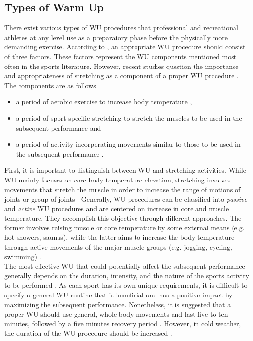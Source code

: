 \subsection{Types of Warm Up}
There exist various types of WU procedures that professional and recreational athletes at any level use as a preparatory phase before the physically more demanding exercise. According to \cite{safran1989warm}, an appropriate WU procedure should consist of three factors. These factors represent the WU components mentioned most often in the sports literature. However, recent studies question the importance and appropriateness of stretching as a component of a proper WU procedure \cite{pereles2012large}. The components are as follows:
\begin{itemize}
\item a period of aerobic exercise to increase body
temperature \cite{safran1989warm},
\item a period of sport-specific stretching to stretch 
the muscles to be used in the subsequent
performance \cite{safran1989warm} and
\item a period of activity incorporating movements
similar to those to be used in the subsequent
performance \cite{safran1989warm}.
\end{itemize}  
First, it is important to distinguish between WU and stretching activities. While WU mainly focuses on core body temperature elevation, stretching involves movements that stretch the muscle in order to increase the range of motions of joints or group of joints \cite{knudson2008warm}. 
Generally, WU procedures can be classified into \textit{passive} and \textit{active} WU procedures and are centered on increase in core and muscle temperature. They accomplish this objective through different approaches. The former involves raising muscle or core temperature by some external means (e.g. hot showers, saunas), while the latter aims to increase the body temperature through active movements of the major muscle groups (e.g. jogging, cycling, swimming) \cite{bishop2003warm2, shellock1985warming}. \\The most effective WU that could potentially affect the subsequent performance generally depends on the duration, intensity, and the nature of the sports activity to be performed \cite{bishop2003warm2}. As each sport has its own unique requirements, it is difficult to specify a general WU routine that is beneficial and has a positive impact by maximizing the subsequent performance. Nonetheless, it is suggested that a proper WU should use general, whole-body movements and last five to ten minutes, followed by a five minutes recovery period \cite{bishop2003warm2}. However, in cold weather, the duration of the WU procedure should be increased \cite{mayr2015prevention}. %
